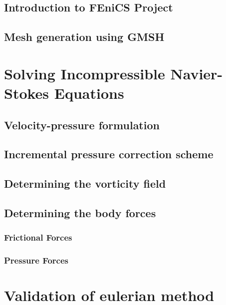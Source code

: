 \subsection{Introduction to FEniCS Project}

\subsection{Mesh generation using GMSH}


\section{Solving Incompressible Navier-Stokes Equations}

\subsection{Velocity-pressure formulation}

\subsection{Incremental pressure correction scheme}

\subsection{Determining the vorticity field}

\subsection{Determining the body forces}

\subsubsection*{Frictional Forces}

\subsubsection*{Pressure Forces}


\section{Validation of eulerian method}

